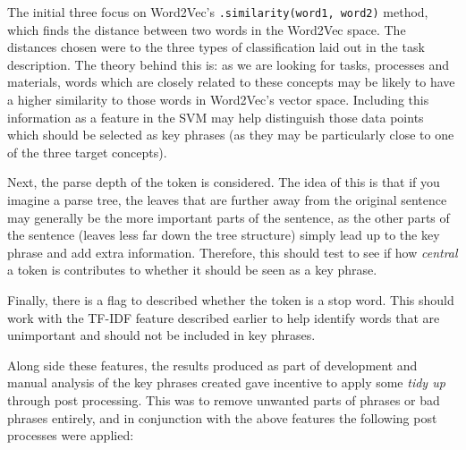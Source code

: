 The initial three focus on Word2Vec's \texttt{.similarity(word1, word2)} method, which finds the distance between two words in the Word2Vec space. The distances chosen were to the three types of classification laid out in the task description. The theory behind this is: as we are looking for tasks, processes and materials, words which are closely related to these concepts may be likely to have a higher similarity to those words in Word2Vec's vector space. Including this information as a feature in the SVM may help distinguish those data points which should be selected as key phrases (as they may be particularly close to one of the three target concepts).

Next, the parse depth of the token is considered. The idea of this is that if you imagine a parse tree, the leaves that are further away from the original sentence may generally be the more important parts of the sentence, as the other parts of the sentence (leaves less far down the tree structure) simply lead up to the key phrase and add extra information. Therefore, this should test to see if how \textit{central} a token is contributes to whether it should be seen as a key phrase.

Finally, there is a flag to described whether the token is a stop word. This should work with the TF-IDF feature described earlier to help identify words that are unimportant and should not be included in key phrases.

Along side these features, the results produced as part of development and manual analysis of the key phrases created gave incentive to apply some \textit{tidy up} through post processing. This was to remove unwanted parts of phrases or bad phrases entirely, and in conjunction with the above features the following post processes were applied:

